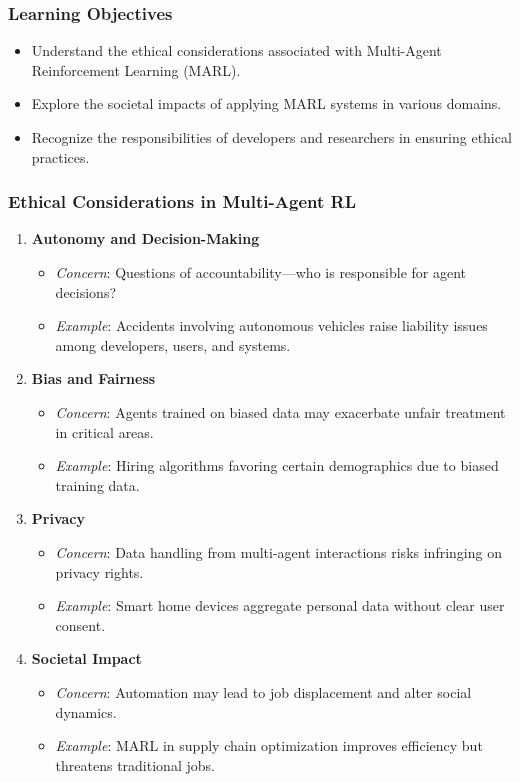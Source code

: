 \documentclass[aspectratio=169]{beamer}
\begin{document}
\begin{frame}[fragile]
    \frametitle{Learning Objectives}
    \begin{itemize}
        \item Understand the ethical considerations associated with Multi-Agent Reinforcement Learning (MARL).
        \item Explore the societal impacts of applying MARL systems in various domains.
        \item Recognize the responsibilities of developers and researchers in ensuring ethical practices.
    \end{itemize}
\end{frame}

\begin{frame}[fragile]
    \frametitle{Ethical Considerations in Multi-Agent RL}
    \begin{enumerate}
        \item \textbf{Autonomy and Decision-Making}
            \begin{itemize}
                \item \textit{Concern}: Questions of accountability—who is responsible for agent decisions?
                \item \textit{Example}: Accidents involving autonomous vehicles raise liability issues among developers, users, and systems.
            \end{itemize}
        
        \item \textbf{Bias and Fairness}
            \begin{itemize}
                \item \textit{Concern}: Agents trained on biased data may exacerbate unfair treatment in critical areas.
                \item \textit{Example}: Hiring algorithms favoring certain demographics due to biased training data.
            \end{itemize}

        \item \textbf{Privacy}
            \begin{itemize}
                \item \textit{Concern}: Data handling from multi-agent interactions risks infringing on privacy rights.
                \item \textit{Example}: Smart home devices aggregate personal data without clear user consent.
            \end{itemize}

        \item \textbf{Societal Impact}
            \begin{itemize}
                \item \textit{Concern}: Automation may lead to job displacement and alter social dynamics.
                \item \textit{Example}: MARL in supply chain optimization improves efficiency but threatens traditional jobs.
            \end{itemize}
    \end{enumerate}
\end{frame}
\end{document}
